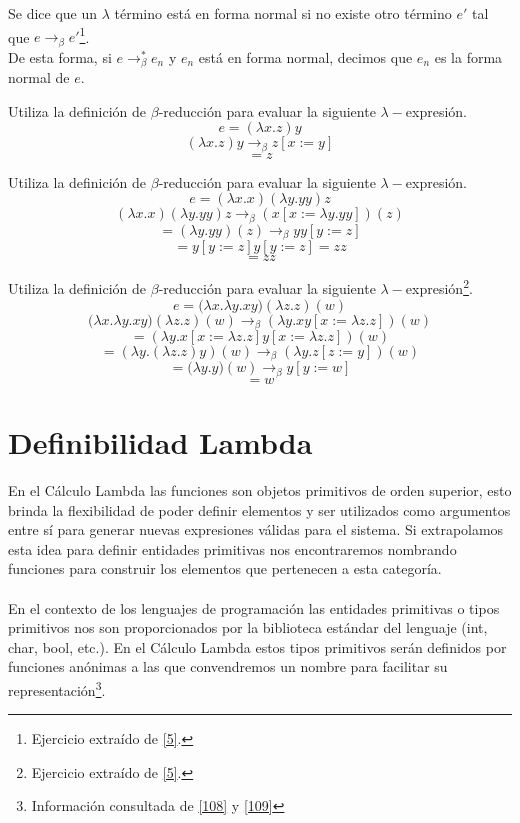 	    \begin{definition} Se dice que un $\lambda$ término está en forma normal si no existe otro término $e'$ tal que $e\to_\beta e'$\footnote{Ejercicio extraído de \hyperlink{5}{[5]}.}.\\

    De esta forma, si $e\to_\beta^*e_n$ y $e_n$ está en forma normal, decimos que $e_n$ es la forma normal de $e$. 
    \end{definition}    

    \begin{exercise}
    Utiliza la definición de $\beta$-reducción para evaluar la siguiente $\lambda-$expresión.
    $$e= (\lambda x.z)y$$
    \[ (\lambda x.z)y \rightarrow_\beta  z [x := y]\]
    \[ = z \]
    \end{exercise}

    \begin{exercise}
        Utiliza la definición de $\beta$-reducción para evaluar la siguiente $\lambda-$expresión.
        $$e = (\lambda x.x)(\lambda y.yy) z$$
        \[ (\lambda x.x)(\lambda y.yy) z \rightarrow_\beta (x[x:=\lambda y.yy])(z)\]
        \[ = (\lambda y.yy)(z) \rightarrow_\beta yy[y:=z]\]
        \[ =  y[y:=z]y[y:=z] = zz\]
       \[= zz \]
    \end{exercise}

    \begin{exercise}
        Utiliza la definición de $\beta$-reducción para evaluar la siguiente $\lambda-$expresión\footnote{Ejercicio extraído de \hyperlink{5}{[5]}.}.
        $$e= \big(\lambda x.\lambda y.xy\big)(\lambda z.z)(w)$$
        \[\big(\lambda x.\lambda y.xy\big)(\lambda z.z)(w) \rightarrow_\beta (\lambda y.xy[x := \lambda z.z])(w) \]
        \[ =  (\lambda y.x[x := \lambda z.z]y[x := \lambda z.z])(w) \]
	 \[ = (\lambda y.(\lambda z.z)y)(w)  \rightarrow_\beta (\lambda y.z[z := y])(w) \]
        \[ = \big(\lambda y.y\big)(w) \rightarrow_\beta y[y := w] \]
        \[ = w \]
    \end{exercise}

    \section{Definibilidad Lambda}
    En el Cálculo Lambda las funciones son objetos primitivos de orden superior, esto brinda la flexibilidad de poder definir elementos y ser utilizados como argumentos entre sí para generar nuevas expresiones válidas para el sistema. Si extrapolamos esta idea para definir entidades primitivas nos encontraremos nombrando funciones para construir los elementos que pertenecen a esta categoría.\\\\
 En el contexto de los lenguajes de programación las entidades primitivas o tipos primitivos nos son proporcionados por la biblioteca estándar del lenguaje (\textsf{int}, \textsf{char}, \textsf{boo}l, etc.). En el Cálculo Lambda estos tipos primitivos serán definidos por funciones anónimas a las que convendremos un nombre para facilitar su representación\footnote{Información consultada de \hyperlink{108}{[108]} y  \hyperlink{109}{[109]}}.

